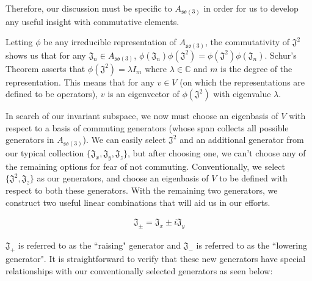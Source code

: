 \documentclass[10pt]{ucthesis}
\newcommand{\C}{\mathbb{C}}
\begin{document}
Therefore, our discussion must be specific to $A_{\mathfrak{so}(3)}$ in order for us to develop any useful insight with commutative elements.

Letting $\phi$ be any irreducible representation of $A_{\mathfrak{so}(3)}$, the commutativity of $\mathfrak{J^2}$ shows us that for any $\mathfrak{J}_n \in A_{\mathfrak{so}(3)}$, $\phi(\mathfrak{J}_n)\phi(\mathfrak{J^2}) = \phi(\mathfrak{J^2})\phi(\mathfrak{J}_n)$. Schur's Theorem asserts that $\phi(\mathfrak{J^2}) = \lambda I_m$ where $\lambda\in\C$ and $m$ is the degree of the representation. This means that for any $v\in V$ (on which the representations are defined to be operators), $v$ is an eigenvector of $\phi(\mathfrak{J^2})$ with eigenvalue $\lambda$.

In search of our invariant subspace, we now must choose an eigenbasis of $V$ with respect to a basis of commuting generators (whose span collects all possible generators in $A_{\mathfrak{so}(3)}$). We can easily select $\mathfrak{J^2}$ and an additional generator from our typical collection $\{\mathfrak{J}_x,\mathfrak{J}_y,\mathfrak{J}_z\}$, but after choosing one, we can't choose any of the remaining options for fear of not commuting. Conventionally, we select $\{\mathfrak{J^2},\mathfrak{J}_z\}$ as our generators, and choose an eigenbasis of $V$ to be defined with respect to both these generators. With the remaining two generators, we construct two useful linear combinations that will aid us in our efforts.

\begin{equation}
	\begin{aligned}
		\mathfrak{J}_\pm = \mathfrak{J}_x \pm i\mathfrak{J}_y
	\end{aligned}
\end{equation} 

$\mathfrak{J}_+$ is referred to as the ``raising" generator and $\mathfrak{J}_-$ is referred to as the ``lowering generator". It is straightforward to verify that these new generators have special relationships with our conventionally selected generators as seen below:
\end{document}
